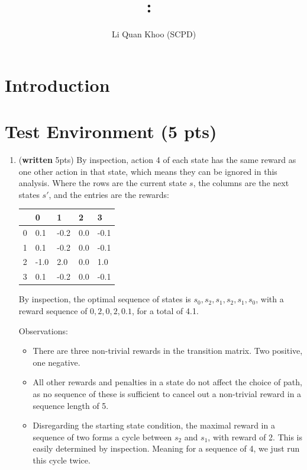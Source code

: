 \documentclass{article}
\title{
\vspace{-1in}
\textmd{\textbf{\hmwkClass:\ \hmwkTitle}}}
\author{Li Quan Khoo (SCPD)}
\date{} %
\begin{document}
\maketitle
\vspace{-.5in}

\section*{Introduction}

\section{Test Environment (5 pts)}

\begin{enumerate}
\item (\textbf{written} 5pts) By inspection, action 4 of each state has the same reward as one other action in that state, which means they can be ignored in this analysis. Where the rows are the current state $s$, the columns are the next states $s'$, and the entries are the rewards:

\begin{center}
	\begin{tabular}{| l | l | l | l | l |}  
		\hline
		  & 0    & 1    & 2    & 3    \\ \hline
		0 &  0.1 & -0.2 &  0.0 & -0.1 \\ \hline
		1 &  0.1 & -0.2 &  0.0 & -0.1 \\ \hline
		2 & -1.0 & 2.0  &  0.0 &  1.0 \\ \hline
		3 &  0.1 & -0.2 &  0.0 & -0.1 \\ \hline
	\end{tabular}
\end{center}

By inspection, the optimal sequence of states is $s_0, s_2, s_1, s_2, s_1, s_0$, with a reward sequence of $0, 2, 0, 2, 0.1$, for a total of 4.1.

Observations:
\begin{itemize}
	\item There are three non-trivial rewards in the transition matrix. Two positive, one negative.
	\item All other rewards and penalties in a state do not affect the choice of path, as no sequence of these is sufficient to cancel out a non-trivial reward in a sequence length of 5.
	\item Disregarding the starting state condition, the maximal reward in a sequence of two forms a cycle between $s_2$ and $s_1$, with reward of 2. This is easily determined by inspection. Meaning for a sequence of 4, we just run this cycle twice.
\end{itemize}


\end{enumerate}
\end{document}
